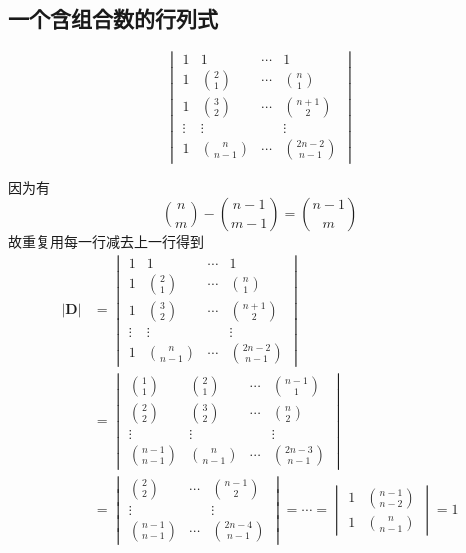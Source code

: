 \subsection{一个含组合数的行列式}
\begin{brown}
\begin{example}
\[
\begin{vmatrix}
    1 & 1 & \cdots & 1\\
    1 & \binom{2}{1} & \cdots & \binom{n}{1} \\
    1 & \binom{3}{2} & \cdots & \binom{n + 1}{2} \\
    \vdots & \vdots & & \vdots \\
    1 & \binom{n }{n - 1} & \cdots & \binom{2n - 2}{ n - 1}   
\end{vmatrix}
\]
\end{example}
\begin{solution}
因为有
\[
 \binom{n}{m}  - \binom{n - 1}{m - 1} = \binom{n - 1}{m}   
\]
故重复用每一行减去上一行得到
\vfill
\begin{align*}
	\left|\bm{D}\right|
	&=
	\begin{vmatrix}
    1 & 1 & \cdots & 1\\
    1 & \binom{2}{1} & \cdots & \binom{n}{1} \\
    1 & \binom{3}{2} & \cdots & \binom{n + 1}{2} \\
    \vdots & \vdots & & \vdots \\
    1 & \binom{n }{n - 1} & \cdots & \binom{2n - 2}{ n - 1}   
\end{vmatrix}\\
&= \begin{vmatrix}
	\binom{1}{1} &\binom{2}{1}& \cdots & \binom{n - 1}{1}\\
	\binom{2}{2} & \binom{3}{2}&\cdots & \binom{n}{2}\\
	\vdots &\vdots& &\vdots\\
	\binom{n -1}{n -1}&\binom{n}{n - 1}&\cdots&\binom{2 n  -3}{n - 1}
\end{vmatrix}\\
&=\begin{vmatrix}
	\binom{2}{2} & \cdots & \binom{n-1}{2}\\
	\vdots &&\vdots\\
	\binom{n-1}{n-1}&\cdots&\binom{2n-4}{n-1}
\end{vmatrix}
=\cdots=\begin{vmatrix}
	1&\binom{n-1}{n-2}\\
	1&\binom{n}{n-1}
\end{vmatrix}
=1
\end{align*}
\end{solution}
\end{brown}
